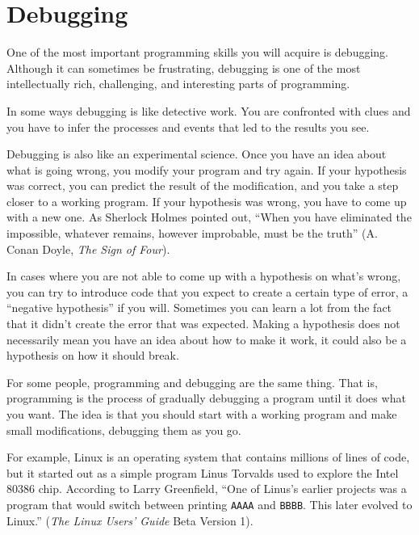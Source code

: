\section{Debugging}

One of the most important programming skills you will 
acquire is debugging. Although it can sometimes be 
frustrating, debugging is one of the most intellectually 
rich, challenging, and interesting parts of programming.

In some ways debugging is like detective work.  You are confronted
with clues and you have to infer the processes and events that led
to the results you see.

Debugging is also like an experimental science.  Once you have an idea
about what is going wrong, you modify your program and try again.  If
your hypothesis was correct, you can predict the result of the
modification, and you take a step closer to a working program.  If
your hypothesis was wrong, you have to come up with a new one.  As
Sherlock Holmes pointed out, ``When you have eliminated the
impossible, whatever remains, however improbable, must be the truth''
(A. Conan Doyle, {\em The Sign of Four}).

In cases where you are not able to come up with a hypothesis 
on what's wrong, you can try to introduce code that you expect 
to create a certain type of error, a ``negative hypothesis'' 
if you will.  Sometimes you can learn a lot from the fact that 
it didn't create the error that was expected. Making a hypothesis 
does not necessarily mean you have an idea about how to make it 
work, it could also be a hypothesis on how it should break.

For some people, programming and debugging are the same thing.  That
is, programming is the process of gradually debugging a program until
it does what you want.  The idea is that you should start with a
working program and make small modifications,
debugging them as you go.

For example, Linux is an operating system that contains millions of
lines of code, but it started out as a simple program Linus Torvalds
used to explore the Intel 80386 chip.  According to Larry Greenfield,
``One of Linus's earlier projects was a program that would switch
between printing \verb"AAAA" and \verb"BBBB".  This later evolved 
to Linux.'' ({\em The Linux Users' Guide} Beta Version 1).


